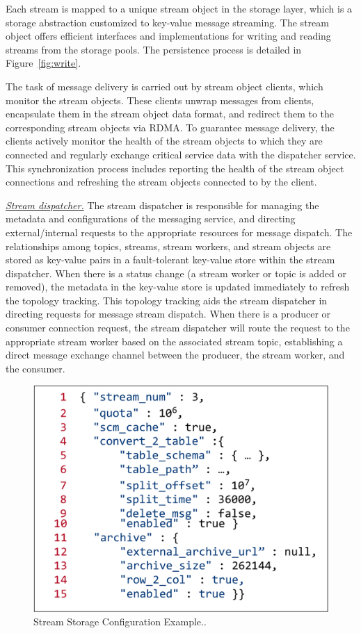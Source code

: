 Each stream is mapped to a unique stream object in the storage layer, which is a  storage abstraction customized to  key-value message streaming. The stream object offers efficient interfaces and implementations for writing and reading streams from the storage pools. The persistence process is detailed in Figure~\ref{fig:write}.

The task of message delivery is carried out by stream object clients, which monitor the stream objects. These clients unwrap messages from clients, encapsulate them in the stream object data format, and redirect them to the corresponding stream objects via RDMA. To guarantee message delivery, the clients actively monitor the health of the stream objects to which they are connected and regularly exchange critical service data with the dispatcher service. This synchronization process includes reporting the health of the stream object connections and refreshing the stream objects connected to by the client.


\noindent\underline{\textit{Stream dispatcher.}} The stream dispatcher is responsible for managing the metadata and configurations of the messaging service, and directing external/internal requests to the appropriate resources for message  dispatch. The relationships among topics, streams, stream workers, and stream objects are stored as key-value pairs in a fault-tolerant key-value store within the stream dispatcher. When there is  a status change   (\eg a stream worker or topic is added or removed), the metadata  in the key-value store is updated immediately to refresh the topology tracking. This topology tracking aids the stream dispatcher in directing requests for message stream dispatch. When there is a producer or consumer connection request, the stream dispatcher will route the request to the appropriate stream worker based on the associated stream topic, establishing a direct message exchange channel between the producer, the stream worker, and the consumer.

\begin{figure}[htbp]
	\includegraphics[scale=0.35]{figures/config}
	\centering
	\vspace{-1em}
	\caption{Stream Storage Configuration Example..}
	\label{fig:config}
	\vspace{-1em}
\end{figure}



